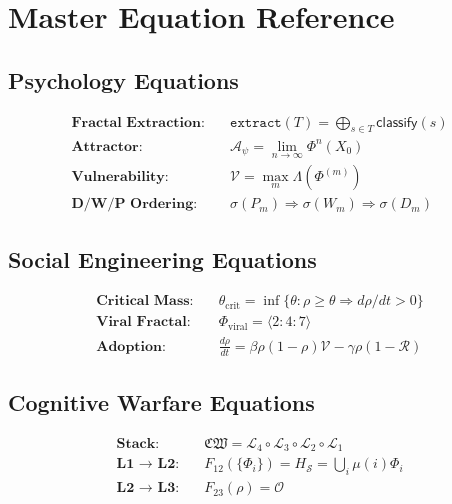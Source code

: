 \documentclass[11pt,twoside]{book}
\theoremstyle{definition}
\theoremstyle{plain}
\theoremstyle{remark}
\newcommand{\Frac}{\Phi}
\newcommand{\PsychAttractor}{\mathcal{A}_\psi}
\newcommand{\Lacunarity}{\Lambda}
\newcommand{\VulnScore}{\mathcal{V}}
\newcommand{\CogWarStack}{\mathfrak{CW}}
\newcommand{\LevelI}{\mathcal{L}_1}
\newcommand{\LevelII}{\mathcal{L}_2}
\newcommand{\LevelIII}{\mathcal{L}_3}
\newcommand{\LevelIV}{\mathcal{L}_4}
\begin{document}
\appendix

\chapter{Master Equation Reference}
\label{app:master-equations}

\section{Psychology Equations}

\begin{align}
    \textbf{Fractal Extraction:} \quad & \mathtt{extract}(T) = \bigoplus_{s \in T} \mathsf{classify}(s) \\
    \textbf{Attractor:} \quad & \PsychAttractor = \lim_{n \to \infty} \Frac^n(X_0) \\
    \textbf{Vulnerability:} \quad & \VulnScore = \max_m \Lacunarity(\Frac^{(m)}) \\
    \textbf{D/W/P Ordering:} \quad & \sigma(P_m) \Rightarrow \sigma(W_m) \Rightarrow \sigma(D_m)
\end{align}

\section{Social Engineering Equations}

\begin{align}
    \textbf{Critical Mass:} \quad & \theta_{\mathrm{crit}} = \inf\{\theta : \rho \geq \theta \Rightarrow d\rho/dt > 0\} \\
    \textbf{Viral Fractal:} \quad & \Frac_{\mathrm{viral}} = \langle 2:4:7 \rangle \\
    \textbf{Adoption:} \quad & \frac{d\rho}{dt} = \beta \rho(1-\rho)\mathcal{V} - \gamma\rho(1-\mathcal{R})
\end{align}

\section{Cognitive Warfare Equations}

\begin{align}
    \textbf{Stack:} \quad & \CogWarStack = \LevelIV \circ \LevelIII \circ \LevelII \circ \LevelI \\
    \textbf{L1 $\to$ L2:} \quad & F_{12}(\{\Frac_i\}) = H_{\mathcal{S}} = \bigcup_i \mu(i)\Frac_i \\
    \textbf{L2 $\to$ L3:} \quad & F_{23}(\rho) = \mathcal{O}
\end{align}
\end{document}
